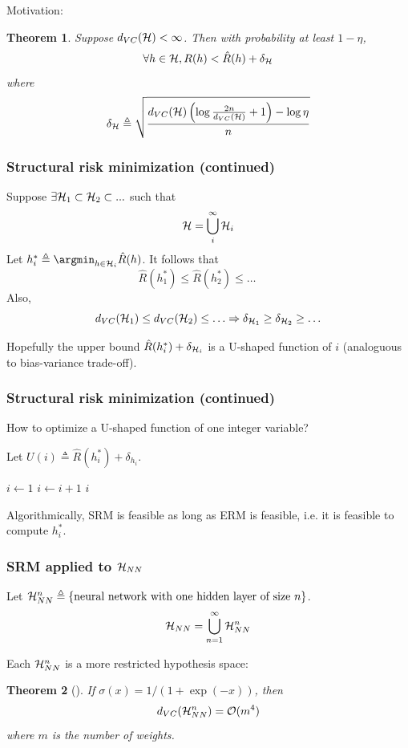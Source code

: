 \documentclass{article}
\newtheorem{theorem}{Theorem}
\begin{document}
Motivation:
\begin{theorem}
Suppose $d_{VC} ({\mathcal H}) < \infty$.
Then with probability at least $1 - \eta$,
\[
\forall h \in {\mathcal H}, R (h) < \hat{R} (h) + \delta_{\mathcal H}
\]
where
\[
\delta_{\mathcal H} \triangleq \sqrt{\frac{d_{VC} ({\mathcal H}) \left(\log \frac{2 n}{d_{VC} ({\mathcal H})} + 1\right) - \log \eta}{n}}
\]
\end{theorem}

\subsubsection{Structural risk minimization (continued)}

Suppose $\exists {\mathcal H}_1 \subset {\mathcal H}_2 \subset ...$ such that
\[
{\mathcal H} = \bigcup_i^\infty {\mathcal H}_i
\]
Let $h_i^* \triangleq \argmin_{h \in \calh_i} \hat{R} (h)$.
It follows that
\[
\hat{R} (h_1^*) \leq \hat{R} (h_2^*) \leq \ldots \qquad
\]
Also,
\[
d_{VC} ({\mathcal H}_1) \leq d_{VC} ({\mathcal H}_2) \leq \ldots
\Rightarrow \delta_{{\mathcal H}_1} \geq \delta_{{\mathcal H}_2} \geq \ldots
\]

Hopefully the upper bound $\hat{R}(h_i^*) + \delta_{{\mathcal H}_i}$ is a U-shaped function of $i$ (analoguous to bias-variance trade-off).

\subsubsection{Structural risk minimization (continued)}

How to optimize a U-shaped function of one integer variable?

Let $U(i) \triangleq \hat{R}(h_i^*) + \delta_{h_i}$.
\begin{algorithmic}
\STATE $i \gets 1$
    \STATE $i \gets i + 1$
\ENDWHILE
\RETURN $i$
\end{algorithmic}

Algorithmically, SRM is feasible as long as ERM is feasible, i.e. it is feasible to compute $h_i^*$.

\subsubsection{SRM applied to ${\mathcal H}_{NN}$}

Let ${\mathcal H}_{NN}^n \triangleq \{\text{neural network with one hidden layer of size}\ n\}$.
\[
{\mathcal H}_{NN} = \bigcup_{n = 1}^\infty {\mathcal H}_{NN}^n
\]

Each ${\mathcal H}_{NN}^n$ is a more restricted hypothesis space:
\begin{theorem}[\cite{maass1995vapnik}]
If $\sigma (x) = 1 / (1 + \exp (-x))$, then
\[
d_{VC} ({\mathcal H}_{NN}^n) = {\mathcal O} (m^4)
\]
where $m$ is the number of weights.
\end{theorem}
\end{document}
